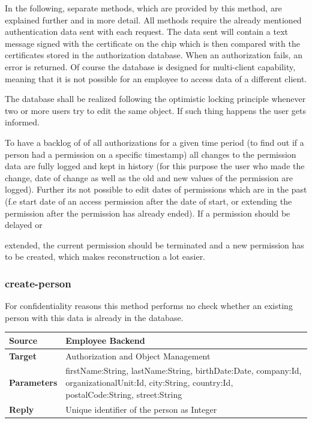 \documentclass[12pt,a4paper,titlepage,oneside]{scrartcl}
\begin{document}
In the following, separate methods, which are provided by this method, are explained further and in more detail. All methods require the already mentioned authentication data sent with each request. The data sent will contain a text message signed with the certificate on the chip which is then compared with the certificates stored in the authorization database. When an authorization fails, an error is returned. Of course the database is designed for multi-client capability, meaning that it is not possible for an employee to access data of a different client.

The database shall be realized following the optimistic locking principle whenever two or more users try to edit the same object. If such thing happens the user gets informed.

To have a backlog of of all authorizations for a given time period (to find out if a person had a permission on a specific timestamp) all changes to the permission data are fully logged and kept in history (for this purpose the user who made the change, date of change as well as the old and new values of the permission are logged). Further its not possible to edit dates of permissions which are in the past (f.e start date of an access permission after the date of start, or extending the permission after the permission has already ended). If a permission should be delayed or

extended, the current permission should be terminated and a new permission has to be created, which makes reconstruction a lot easier.

\subsubsection{create-person}

For confidentiality reasons this method performs no check whether an existing person with this data is already in the database.

\begin{table}[h]
    \centering
    \begin{tabular}{|l|p{12cm}|} \hline
    \textbf{Source}&Employee Backend\\ \hline
    \textbf{Target}&Authorization and Object Management\\ \hline
    \textbf{Parameters}&firstName:String, lastName:String, birthDate:Date, company:Id, organizationalUnit:Id, city:String, country:Id, postalCode:String, street:String\\ \hline
    \textbf{Reply}&Unique identifier of the person as Integer\\ \hline
    \end{tabular}
\end{table}
\end{document}
